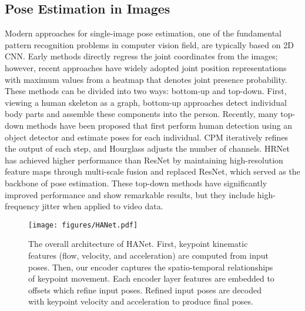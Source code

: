\documentclass[10pt,twocolumn,letterpaper]{article}
\begin{document}
\subsection{Pose Estimation in Images}

Modern approaches for single-image pose estimation, one of the fundamental pattern recognition problems \cite{fujisawa1999information,lee1990translation,lee1999integrated,pr7} in computer vision field, are typically based on 2D CNN. Early methods \cite{toshev2014deeppose} directly regress the joint coordinates from the images; however, recent approaches \cite{hrnet,partaffinityfields,cpm,fcpose,hourglass} have widely adopted joint position representations with maximum values from a heatmap that denotes joint presence probability. These methods can be divided into two ways: bottom-up and top-down. First, viewing a human skeleton as a graph, bottom-up approaches \cite{partaffinityfields,deepcut} detect individual body parts and assemble these components into the person. Recently, many top-down methods \cite{hourglass,cpm,hrnet} have been proposed that first perform human detection using an object detector and estimate poses for each individual. CPM \cite{cpm} iteratively refines the output of each step, and Hourglass \cite{hourglass} adjusts the number of channels. HRNet \cite{hrnet} has achieved higher performance than ResNet \cite{resnet} by maintaining high-resolution feature maps through multi-scale fusion and replaced ResNet, which served as the backbone of pose estimation. These top-down methods have significantly improved performance and show remarkable results, but they include high-frequency jitter when applied to video data.

\begin{figure*}[t]
\centering
\texttt{[image: figures/HANet.pdf]}
\caption{The overall architecture of HANet. First, keypoint kinematic features (flow, velocity, and acceleration) are computed from input poses. Then, our encoder captures the spatio-temporal relationships of keypoint movement. Each encoder layer features are embedded to offsets which refine input poses. Refined input poses are decoded with keypoint velocity and acceleration to produce final poses.}
\label{fig:pipeline}
\end{figure*}
\end{document}
